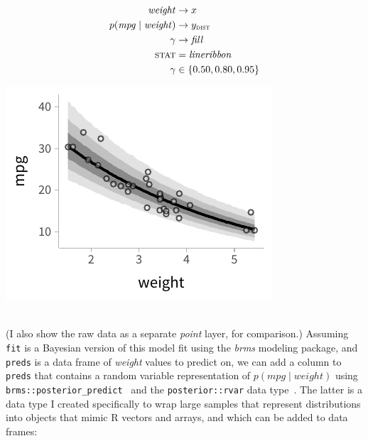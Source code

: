 \documentclass[journal]{vgtc}                     %
\newcommand{\equationfigure}[2]{%
\noindent
\begin{minipage}{.5\columnwidth}
\setlength{\abovedisplayskip}{0pt}
\setlength{\belowdisplayskip}{0pt}
#1\end{minipage}%
\begin{minipage}{.4\columnwidth}\centering #2 \end{minipage}%
\vspace{.5\belowdisplayskip}\\
}
\begin{document}
\equationfigure{
\begin{align*}
\mathit{weight} &\rightarrow x\\
p(\mathit{mpg} \mid \mathit{weight}) &\rightarrow y_\textsc{dist}\\
\gamma &\rightarrow \mathit{fill}\\
\textsc{stat} &= \mathit{lineribbon}\\
\gamma &\in \{0.50, 0.80, 0.95\}
\end{align*}
}{\includegraphics[width=1.2\columnwidth]{figs/3-lineribbon.pdf}}
(I also show the raw data as a separate \textit{point} layer, for comparison.) Assuming \texttt{fit}  is a Bayesian version of this model fit using the \textit{brms} modeling package, and \texttt{preds} is a data frame of \textit{weight} values to predict on, we can add a column to \texttt{preds} that contains a random variable representation of $p(\mathit{mpg} \mid \mathit{weight})$ using \texttt{brms::posterior\_predict}~\cite{burkner2017brms} and the \texttt{posterior::rvar}  data type~\cite{burkner2022posterior}. The latter is a data type I created specifically to wrap large samples that represent distributions into objects that mimic R vectors and arrays,
and which can be added to data frames:
\end{document}
